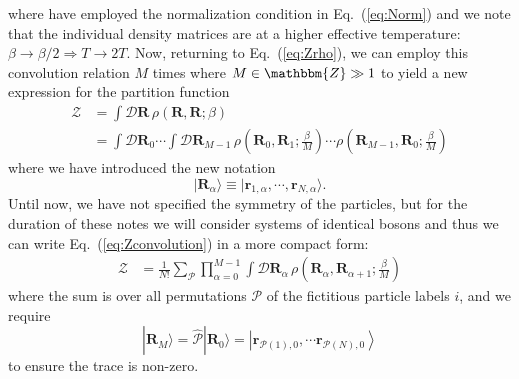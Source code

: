 \documentclass[prb,aps,amssym,nofootinbib,floatfix,notitlepage]{revtex4-1}
\renewcommand{\vec}[1]{\boldsymbol{#1}}
\renewcommand{\eqref}[1]{Eq.~(\ref{#1})}
\newcommand{\R}{\vec{R}}
\begin{document}
%
where have employed the normalization condition in \eqref{eq:Norm} and
we note that the individual density matrices are at a higher effective
temperature: $\beta \to \beta/2 \Rightarrow T \to 2 T$. Now, returning to
\eqref{eq:Zrho}, we can employ this convolution relation $M$ times where $M \in
\mathbbm{Z} \gg 1$ to yield a new expression for the partition function
%
\begin{align}
    \mathcal{Z}  &= \int \mathcal{D}\R\, \rho(\R,\R;\beta) \nonumber \\
                 &= \int \mathcal{D}\R_0 \cdots \int \mathcal{D}\R_{M-1}\,
    \rho\left(\R_0,\R_{1};\frac{\beta}{M}\right) \cdots
    \rho\left(\R_{M-1},\R_{0};\frac{\beta}{M}\right)
    \label{eq:Zconvolution}
\end{align}
%
where we have introduced the new notation
%
\begin{equation}
    |\R_\alpha\rangle \equiv |\vec{r}_{1,\alpha}, \cdots, \vec{r}_{N,\alpha}
    \rangle.
\end{equation}
%
Until now, we have not specified the symmetry of the particles, but for the
duration of these notes we will consider systems of identical bosons and thus
we can write \eqref{eq:Zconvolution} in a more compact form:
%
\begin{align}
    \mathcal{Z}  &= \frac{1}{N!}\sum_{\mathcal{P}} 
    \prod_{\alpha=0}^{M-1}\int \mathcal{D}\R_\alpha\,
    \rho\left(\R_\alpha,\R_{\alpha+1};\frac{\beta}{M}\right)
    \label{eq:Zpermute}
\end{align}
%
where the sum is over all permutations $\mathcal{P}$ of the fictitious particle
labels $i$, and we require
%
\begin{equation}
    |\R_M\rangle = \hat{\mathcal{P}} |\R_0\rangle =
    \left|\vec{r}_{\mathcal{P}(1),0}, \cdots \vec{r}_{\mathcal{P}(N),0} \right \rangle
\end{equation}
%
to ensure the trace is non-zero.
\end{document}
